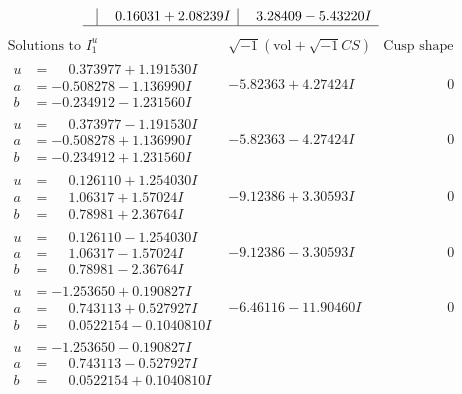 \documentclass[1p]{elsarticle_modified}
\theoremstyle{definition}
\newcommand{\I}{\sqrt{-1}}
\begin{document}
$$\begin{array}{c|c|c}
 & \phantom{-}0.16031 + 2.08239 I & \phantom{-}3.28409 - 5.43220 I\\
 \hline 
 \end{array}$$\newpage$$\begin{array}{c|c|c}  
\text{Solutions to }I^u_{1}& \I (\text{vol} + \sqrt{-1}CS) & \text{Cusp shape}\\
 \hline 
\begin{aligned}
u &= \phantom{-}0.373977 + 1.191530 I \\
a &= -0.508278 - 1.136990 I \\
b &= -0.234912 - 1.231560 I\end{aligned}
 & -5.82363 + 4.27424 I & \phantom{-0.000000 } 0 \\ \hline\begin{aligned}
u &= \phantom{-}0.373977 - 1.191530 I \\
a &= -0.508278 + 1.136990 I \\
b &= -0.234912 + 1.231560 I\end{aligned}
 & -5.82363 - 4.27424 I & \phantom{-0.000000 } 0 \\ \hline\begin{aligned}
u &= \phantom{-}0.126110 + 1.254030 I \\
a &= \phantom{-}1.06317 + 1.57024 I \\
b &= \phantom{-}0.78981 + 2.36764 I\end{aligned}
 & -9.12386 + 3.30593 I & \phantom{-0.000000 } 0 \\ \hline\begin{aligned}
u &= \phantom{-}0.126110 - 1.254030 I \\
a &= \phantom{-}1.06317 - 1.57024 I \\
b &= \phantom{-}0.78981 - 2.36764 I\end{aligned}
 & -9.12386 - 3.30593 I & \phantom{-0.000000 } 0 \\ \hline\begin{aligned}
u &= -1.253650 + 0.190827 I \\
a &= \phantom{-}0.743113 + 0.527927 I \\
b &= \phantom{-}0.0522154 - 0.1040810 I\end{aligned}
 & -6.46116 - 11.90460 I & \phantom{-0.000000 } 0 \\ \hline\begin{aligned}
u &= -1.253650 - 0.190827 I \\
a &= \phantom{-}0.743113 - 0.527927 I \\
b &= \phantom{-}0.0522154 + 0.1040810 I\end{aligned}

\end{array}$$
\end{document}
